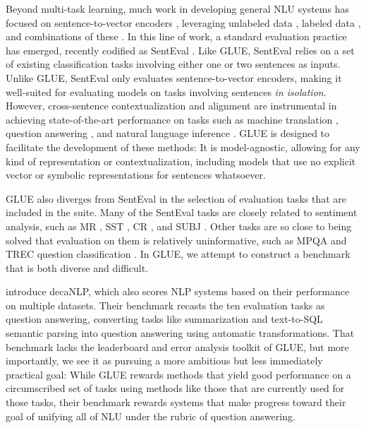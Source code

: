 Beyond multi-task learning, much work in developing general NLU systems has focused on sentence-to-vector encoders \citep[][ i.a.]{pmlr-v32-le14,kiros2015skip}, leveraging unlabeled data 
\citep{hill2016learning,peters2018deep}, labeled data \citep{conneau2018senteval,mccann2017learned}, and combinations of these \citep{collobert2011natural,subramanian2018large}.
In this line of work, a standard evaluation practice has emerged, recently codified as SentEval \citep{DBLP:conf/emnlp/ConneauKSBB17,conneau2018senteval}.
Like GLUE, SentEval relies on a set of existing classification tasks involving either one or two sentences as inputs. Unlike GLUE, SentEval only evaluates sentence-to-vector encoders, making it well-suited for evaluating models on tasks involving sentences \emph{in isolation}.
However, cross-sentence contextualization and alignment are instrumental in achieving state-of-the-art performance on tasks such as machine translation \citep{bahdanau2014neural,vaswani2017attention}, question answering \citep{seo2016bidirectional}, and natural language inference \citep{rocktaschel2015reasoning}.
GLUE is designed to facilitate the development of these methods: It is model-agnostic, allowing for any kind of representation or contextualization, including models that use no explicit vector or symbolic representations for sentences whatsoever.

GLUE also diverges from SentEval in the selection of evaluation tasks that are included in the suite. Many of the SentEval tasks are closely related to sentiment analysis, such as MR \citep{pang2005seeing}, SST \citep{socher2013recursive}, CR \citep{hu2004mining}, and SUBJ \citep{pang2004sentimental}. Other tasks are so close to being solved that evaluation on them is relatively  uninformative, such as MPQA \citep{wiebe2005annotating} and TREC question classification \citep{voorhees1999trec}. In GLUE, we attempt to construct a benchmark that is both diverse and difficult.

\citet{McCann2018decaNLP} introduce decaNLP, which also scores NLP systems based on their performance on multiple datasets. Their benchmark recasts the ten evaluation tasks as question answering, converting tasks like summarization and text-to-SQL semantic parsing into question answering using automatic transformations. That benchmark lacks the leaderboard and error analysis toolkit of GLUE, but more importantly, we see it as pursuing a more ambitious but less immediately practical goal: While GLUE rewards methods that yield good performance on a circumscribed set of tasks using methods like those that are currently used for those tasks, their benchmark rewards systems that make progress toward their goal of unifying all of NLU under the rubric of question answering.

